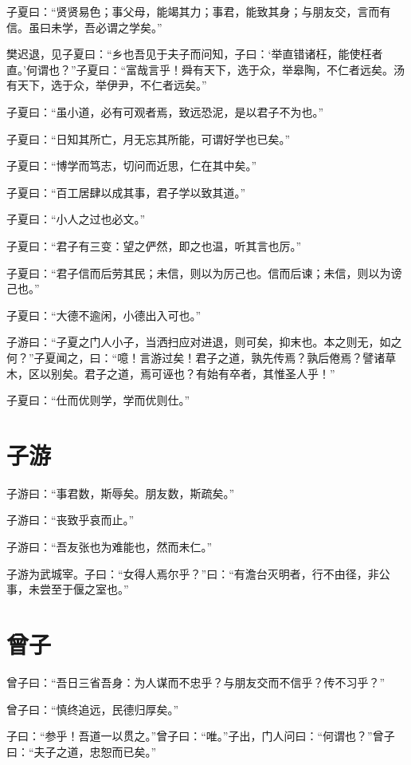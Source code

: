 \documentclass[a5paper]{ctexbook}
\begin{document}
    子夏曰：“贤贤易色；事父母，能竭其力；事君，能致其身；与朋友交，言而有信。虽曰未学，吾必谓之学矣。”

    樊迟退，见子夏曰：“乡也吾见于夫子而问知，子曰：‘举直错诸枉，能使枉者直。’何谓也？”子夏曰：“富哉言乎！舜有天下，选于众，举皋陶，不仁者远矣。汤有天下，选于众，举伊尹，不仁者远矣。”

    子夏曰：“虽小道，必有可观者焉，致远恐泥，是以君子不为也。”
    
    子夏曰：“日知其所亡，月无忘其所能，可谓好学也已矣。”
    
    子夏曰：“博学而笃志，切问而近思，仁在其中矣。”

    子夏曰：“百工居肆以成其事，君子学以致其道。”
    
    子夏曰：“小人之过也必文。”
    
    子夏曰：“君子有三变：望之俨然，即之也温，听其言也厉。”

    子夏曰：“君子信而后劳其民；未信，则以为厉己也。信而后谏；未信，则以为谤己也。”
    
    子夏曰：“大德不逾闲，小德出入可也。”
    
    子游曰：“子夏之门人小子，当洒扫应对进退，则可矣，抑末也。本之则无，如之何？”子夏闻之，曰：“噫！言游过矣！君子之道，孰先传焉？孰后倦焉？譬诸草木，区以别矣。君子之道，焉可诬也？有始有卒者，其惟圣人乎！”

    子夏曰：“仕而优则学，学而优则仕。”

    \chapter{子游}

    子游曰：“事君数，斯辱矣。朋友数，斯疏矣。”

    子游曰：“丧致乎哀而止。”
    
    子游曰：“吾友张也为难能也，然而未仁。”

    子游为武城宰。子曰：“女得人焉尔乎？”曰：“有澹台灭明者，行不由径，非公事，未尝至于偃之室也。”

    \chapter{曾子}

    曾子曰：“吾日三省吾身：为人谋而不忠乎？与朋友交而不信乎？传不习乎？”

    曾子曰：“慎终追远，民德归厚矣。”

    子曰：“参乎！吾道一以贯之。”曾子曰：“唯。”子出，门人问曰：“何谓也？”曾子曰：“夫子之道，忠恕而已矣。”
\end{document}
